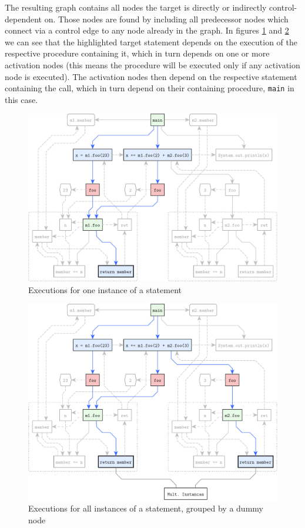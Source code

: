 The resulting graph contains all nodes the target is directly or indirectly control-dependent on. Those nodes are found 
by including all predecessor nodes which connect via a control edge to any node already in the graph. In figures 
\ref{fig:sdg-executions_one} and \ref{fig:sdg-executions_all} we can see that the highlighted target statement depends 
on the execution of the respective procedure containing it, which in turn depends on one or more activation nodes (this 
means the procedure will be executed only if any activation node is executed). The activation nodes then depend on the 
respective statement containing the call, which in turn depend on their containing procedure, \lstinline|main| in this 
case.

\begin{figure}[tbp]
  \centering
    \includegraphics[scale=0.6]{sdgs/executions_one}
  \caption{Executions for one instance of a statement}
  \label{fig:sdg-executions_one}
\end{figure}

\begin{figure}[tbp]
  \centering
    \includegraphics[scale=0.6]{sdgs/executions_all}
  \caption{Executions for all instances of a statement, grouped by a dummy node}
  \label{fig:sdg-executions_all}
\end{figure}


